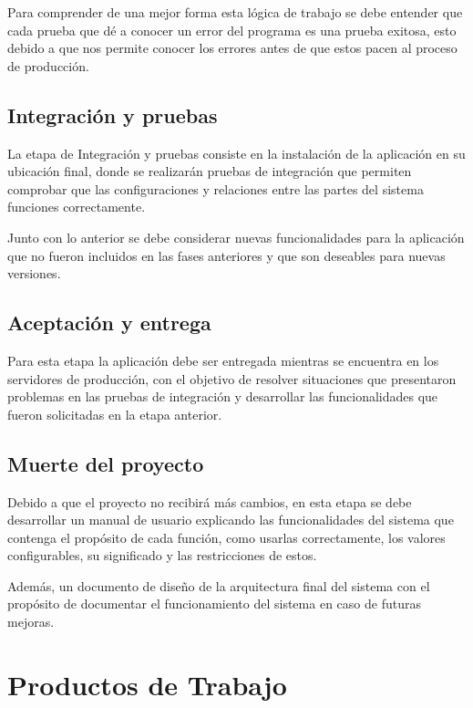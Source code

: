 Para comprender de una mejor forma esta lógica de trabajo se debe entender que cada prueba que dé a conocer un error del programa es una prueba exitosa, esto debido a que nos permite conocer los errores antes de que estos pacen al proceso de producción. 

\subsection{Integración y pruebas}

La etapa de Integración y pruebas consiste en la instalación de la aplicación en su ubicación final, donde se realizarán pruebas de integración que permiten comprobar que las configuraciones y relaciones entre las partes del sistema funciones correctamente. 

Junto con lo anterior se debe considerar nuevas funcionalidades para la aplicación que no fueron incluidos en las fases anteriores y que son deseables para nuevas versiones.

\subsection{Aceptación y entrega}

Para esta etapa la aplicación debe ser entregada mientras se encuentra en los servidores de producción, con el objetivo de resolver situaciones que presentaron problemas en las pruebas de integración y desarrollar las funcionalidades que fueron solicitadas en la etapa anterior. 

\subsection{Muerte del proyecto}

Debido a que el proyecto no recibirá más cambios, en esta etapa se debe desarrollar un manual de usuario explicando las funcionalidades del sistema que contenga el propósito de cada función, como usarlas correctamente, los valores configurables, su significado y las restricciones de estos.

Además, un documento de diseño de la arquitectura final del sistema con el propósito de documentar el funcionamiento del sistema en caso de futuras mejoras. 

\section{Productos de Trabajo}

